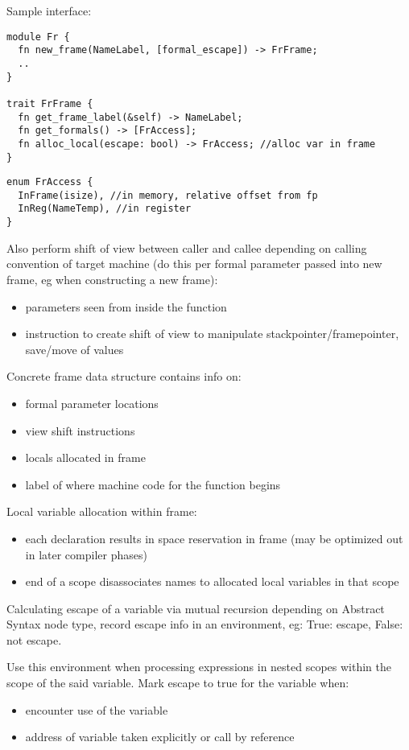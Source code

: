 \documentclass[8pt]{extarticle}
\begin{document}
\begin{multicols*}{2}
  Sample interface:
\begin{verbatim}
module Fr {
  fn new_frame(NameLabel, [formal_escape]) -> FrFrame;
  ..
}

trait FrFrame {
  fn get_frame_label(&self) -> NameLabel;
  fn get_formals() -> [FrAccess];
  fn alloc_local(escape: bool) -> FrAccess; //alloc var in frame
}
\end{verbatim}
  
\begin{verbatim}
enum FrAccess {
  InFrame(isize), //in memory, relative offset from fp
  InReg(NameTemp), //in register
}
\end{verbatim}

  Also perform shift of view between caller and callee depending on calling convention of target machine (do this per formal parameter passed into new frame, eg when constructing a new frame):
  \begin{itemize}
  \item parameters seen from inside the function
  \item instruction to create shift of view to manipulate stackpointer/framepointer, save/move of values
  \end{itemize}

  Concrete frame data structure contains info on:
  \begin{itemize}
  \item formal parameter locations
  \item view shift instructions
  \item locals allocated in frame
  \item label of where machine code for the function begins
  \end{itemize}

  Local variable allocation within frame:
  \begin{itemize}
  \item each declaration results in space reservation in frame (may be optimized out in later compiler phases)
  \item end of a scope disassociates names to allocated local variables in that scope
  \end{itemize}

  Calculating escape of a variable via mutual recursion depending on Abstract Syntax node type, record escape info in an environment, eg: True: escape, False: not escape.
  
  Use this environment when processing expressions in nested scopes within the scope of the said variable. Mark escape to true for the variable when:
  \begin{itemize}
  \item encounter use of the variable
  \item address of variable taken explicitly or call by reference
  \end{itemize}


\end{multicols*}
\end{document}
